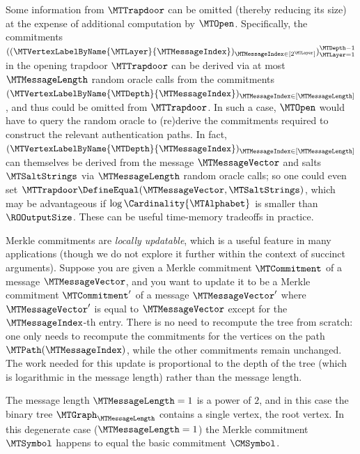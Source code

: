 \begin{remark}
\label{remark:recomputing-the-tree}
Some information from $\MTTrapdoor$ can be omitted (thereby reducing its size) at the expense of additional computation by $\MTOpen$. Specifically, the commitments $((\MTVertexLabelByName{\MTLayer}{\MTMessageIndex})_{\MTMessageIndex \in [2^{\MTLayer}]})_{\MTLayer=1}^{\MTDepth-1}$ in the opening trapdoor $\MTTrapdoor$ can be derived via at most $\MTMessageLength$ random oracle calls from the commitments $(\MTVertexLabelByName{\MTDepth}{\MTMessageIndex})_{\MTMessageIndex \in [\MTMessageLength]}$, and thus could be omitted from $\MTTrapdoor$. In such a case, $\MTOpen$ would have to query the random oracle to (re)derive the commitments required to construct the relevant authentication paths. In fact, $(\MTVertexLabelByName{\MTDepth}{\MTMessageIndex})_{\MTMessageIndex \in [\MTMessageLength]}$ can themselves be derived from the message $\MTMessageVector$ and salts $\MTSaltStrings$ via $\MTMessageLength$ random oracle calls; so one could even set $\MTTrapdoor \DefineEqual (\MTMessageVector,\MTSaltStrings)$, which may be advantageous if $\log\Cardinality{\MTAlphabet}$ is smaller than $\ROOutputSize$. These can be useful time-memory tradeoffs in practice.
\end{remark}

\begin{remark}
\label{remark:locally-updatable}
Merkle commitments are \emph{locally updatable}, which is a useful feature in many applications (though we do not explore it further within the context of succinct arguments). Suppose you are given a Merkle commitment $\MTCommitment$ of a message $\MTMessageVector$, and you want to update it to be a Merkle commitment $\MTCommitment'$ of a message $\MTMessageVector'$ where $\MTMessageVector'$ is equal to $\MTMessageVector$ except for the $\MTMessageIndex$-th entry. There is no need to recompute the tree from scratch: one only needs to recompute the commitments for the vertices on the path $\MTPath(\MTMessageIndex)$, while the other commitments remain unchanged. The work needed for this update is proportional to the depth of the tree (which is logarithmic in the message length) rather than the message length.
\end{remark}

\begin{remark}[$\MTMessageLength=1$]
\label{remark:mt-message-length-one}
The message length $\MTMessageLength=1$ is a power of $2$, and in this case the binary tree $\MTGraph_{\MTMessageLength}$ contains a single vertex, the root vertex. In this degenerate case ($\MTMessageLength=1$) the Merkle commitment $\MTSymbol$ happens to equal the basic commitment $\CMSymbol$.
\end{remark}

